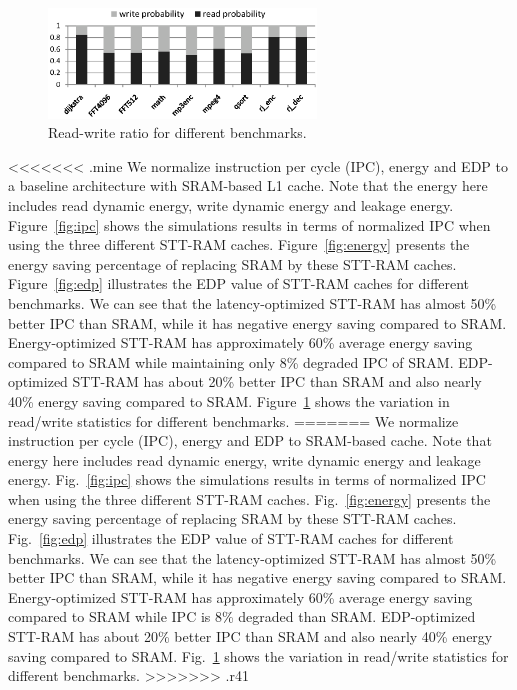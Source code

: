 \begin{figure}[t]
  \centering
  \includegraphics[width=2.8in]{fig/RWratio.eps}
  \caption{Read-write ratio for different benchmarks.}
  \label{fig:ratio}
\vspace{-15pt}
\end{figure}

<<<<<<< .mine
We normalize instruction per cycle (IPC), energy and EDP to a baseline architecture with SRAM-based L1 cache. Note that the energy here includes read dynamic energy, write dynamic energy and leakage energy. Figure~\ref{fig:ipc} shows the simulations results in terms of normalized IPC when using the three different STT-RAM caches. Figure~\ref{fig:energy} presents the energy saving percentage of replacing SRAM by these STT-RAM caches. Figure~\ref{fig:edp} illustrates the EDP value of STT-RAM caches for different benchmarks. We can see that the latency-optimized STT-RAM has almost 50\% better IPC than SRAM, while it has negative energy saving compared to SRAM. Energy-optimized STT-RAM has approximately 60\% average energy saving compared to SRAM while maintaining only 8\% degraded IPC of SRAM. EDP-optimized STT-RAM has about 20\% better IPC than SRAM and also nearly 40\% energy saving compared to SRAM. Figure~\ref{fig:ratio} shows the variation in read/write statistics for different benchmarks. =======
We normalize instruction per cycle (IPC), energy and EDP to SRAM-based cache. Note that energy here includes read dynamic energy, write dynamic energy and leakage energy. Fig.~\ref{fig:ipc} shows the simulations results in terms of normalized IPC when using the three different STT-RAM caches. Fig.~\ref{fig:energy} presents the energy saving percentage of replacing SRAM by these STT-RAM caches. Fig.~\ref{fig:edp} illustrates the EDP value of STT-RAM caches for different benchmarks. We can see that the latency-optimized STT-RAM has almost 50\% better IPC than SRAM, while it has negative energy saving compared to SRAM. Energy-optimized STT-RAM has approximately 60\% average energy saving compared to SRAM while IPC is 8\% degraded than SRAM. EDP-optimized STT-RAM has about 20\% better IPC than SRAM and also nearly 40\% energy saving compared to SRAM. Fig.~\ref{fig:ratio} shows the variation in read/write statistics for different benchmarks. >>>>>>> .r41
